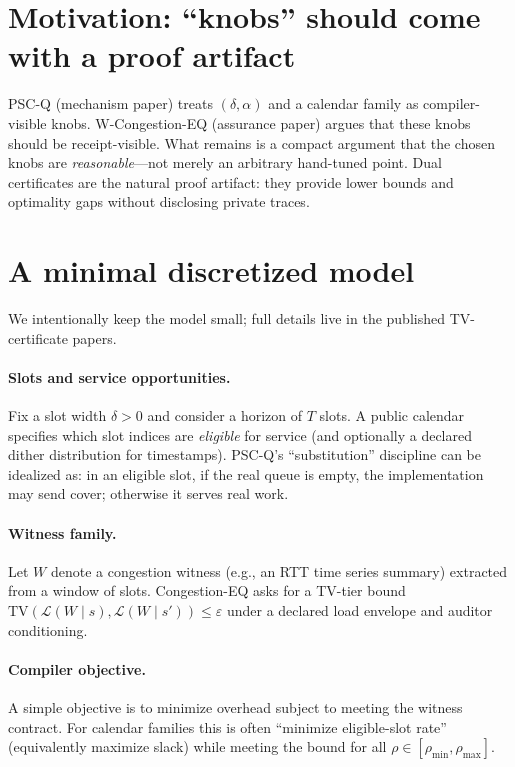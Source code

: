 \documentclass[11pt]{article}
\theoremstyle{definition}
\theoremstyle{remark}
\newcommand{\TV}{\mathrm{TV}}
\newcommand{\eps}{\varepsilon}
\begin{document}
\section{Motivation: ``knobs'' should come with a proof artifact}
PSC-Q (mechanism paper) treats $(\delta,\alpha)$ and a calendar family as compiler-visible knobs.
W-Congestion-EQ (assurance paper) argues that these knobs should be receipt-visible.
What remains is a compact argument that the chosen knobs are \emph{reasonable}---not merely an arbitrary hand-tuned point.
Dual certificates are the natural proof artifact: they provide lower bounds and optimality gaps without disclosing private traces.

\section{A minimal discretized model}
We intentionally keep the model small; full details live in the published TV-certificate papers.

\paragraph{Slots and service opportunities.}
Fix a slot width $\delta>0$ and consider a horizon of $T$ slots.
A public calendar specifies which slot indices are \emph{eligible} for service (and optionally a declared dither distribution for timestamps).
PSC-Q's ``substitution'' discipline can be idealized as: in an eligible slot, if the real queue is empty, the implementation may send cover;
otherwise it serves real work.

\paragraph{Witness family.}
Let $W$ denote a congestion witness (e.g., an RTT time series summary) extracted from a window of slots.
Congestion-EQ asks for a TV-tier bound $\TV(\mathcal{L}(W\mid s),\mathcal{L}(W\mid s'))\le \eps$ under a declared load envelope and auditor conditioning.

\paragraph{Compiler objective.}
A simple objective is to minimize overhead subject to meeting the witness contract.
For calendar families this is often ``minimize eligible-slot rate'' (equivalently maximize slack) while meeting the bound for all $\rho\in[\rho_{\min},\rho_{\max}]$.
\end{document}
